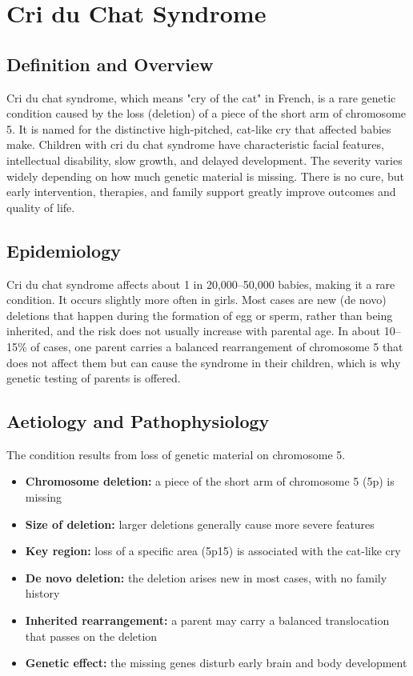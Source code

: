 \chapter{Cri du Chat Syndrome}

\section*{Definition and Overview}
Cri du chat syndrome, which means "cry of the cat" in French, is a rare genetic condition caused by the loss (deletion) of a piece of the short arm of chromosome 5. It is named for the distinctive high-pitched, cat-like cry that affected babies make. Children with cri du chat syndrome have characteristic facial features, intellectual disability, slow growth, and delayed development. The severity varies widely depending on how much genetic material is missing. There is no cure, but early intervention, therapies, and family support greatly improve outcomes and quality of life.

\section*{Epidemiology}
Cri du chat syndrome affects about 1 in 20,000--50,000 babies, making it a rare condition. It occurs slightly more often in girls. Most cases are new (de novo) deletions that happen during the formation of egg or sperm, rather than being inherited, and the risk does not usually increase with parental age. In about 10--15\% of cases, one parent carries a balanced rearrangement of chromosome 5 that does not affect them but can cause the syndrome in their children, which is why genetic testing of parents is offered.

\section*{Aetiology and Pathophysiology}
The condition results from loss of genetic material on chromosome 5.

\begin{itemize}
    \item \textbf{Chromosome deletion:} a piece of the short arm of chromosome 5 (5p) is missing
    \item \textbf{Size of deletion:} larger deletions generally cause more severe features
    \item \textbf{Key region:} loss of a specific area (5p15) is associated with the cat-like cry
    \item \textbf{De novo deletion:} the deletion arises new in most cases, with no family history
    \item \textbf{Inherited rearrangement:} a parent may carry a balanced translocation that passes on the deletion
    \item \textbf{Genetic effect:} the missing genes disturb early brain and body development
\end{itemize}

